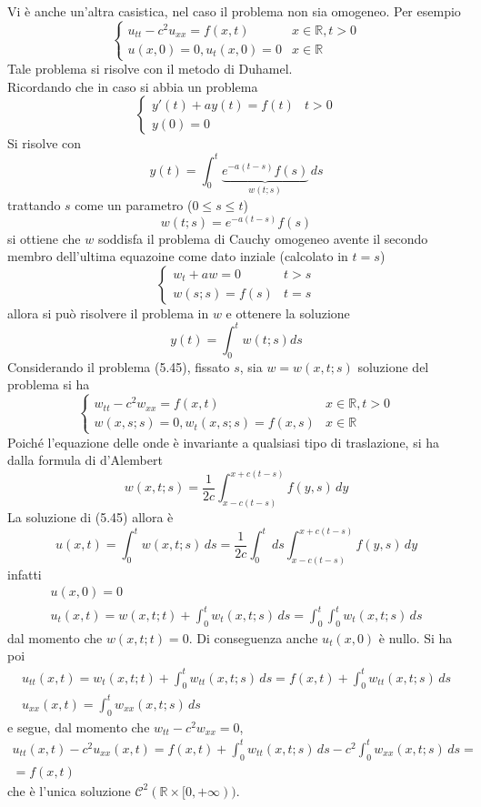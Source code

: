 \documentclass[a4paper,12pt, draft]{article}
\theoremstyle{break}
\numberwithin{equation}{section}
\begin{document}
Vi è anche un'altra casistica, nel caso il problema non sia omogeneo. Per esempio
\begin{equation}
  \begin{cases}
    u_{tt} - c^2 u_{xx} = f(x,t) & x \in \mathbb{R}, t > 0 \\
    u(x,0) = 0, u_t(x,0)= 0 & x \in \mathbb{R}
  \end{cases}
\end{equation}
Tale problema si risolve con il metodo di Duhamel. \\
Ricordando che in caso si abbia un problema 
\[
  \begin{cases} 
y'(t) + ay(t) = f(t) & t > 0 \\
y(0) = 0  
\end{cases}
\]
Si risolve con 
\[
  y(t) = \int_0^t \underbrace{e^{-a(t-s)}f(s)}_{w(t;s)} \, ds
\]
trattando \(s\) come un parametro (\(0 \leq s \leq t\))
\[
  w(t;s) = e^{-a(t-s)}f(s)
\]
si ottiene che \(w\) soddisfa il problema di Cauchy omogeneo avente il secondo membro dell'ultima equazoine come dato inziale (calcolato in \(t=s\))
\[
\begin{cases}
  w_t + aw = 0 & t > s \\
  w(s;s) = f(s) & t = s
\end{cases}  
\]
allora si può risolvere il problema in \(w\) e ottenere la soluzione 
\[
  y(t) = \int_0^t w(t;s)ds
\]
Considerando il problema (5.45), fissato \(s\), sia \(w = w(x, t; s)\) soluzione del problema si ha
\[
\begin{cases}
  w_{tt} - c^2w_{xx} = f(x,t) & x \in \mathbb{R}, t > 0 \\
  w(x, s; s) = 0, w_t(x, s; s) = f(x,s) & x \in \mathbb{R}
\end{cases}  
\]
Poiché l'equazione delle onde è invariante a qualsiasi tipo di traslazione, si ha dalla formula di d'Alembert
\[
w(x,t;s) = \frac{1}{2c} \int_{x-c(t-s)}^{x+c(t-s)} f(y,s) \, dy  
\]
La soluzione di (5.45) allora è
\[
  u(x,t) = \int_0^t w(x,t;s) \, ds = \frac{1}{2c} \int_0^t \, ds \int_{x-c(t-s)}^{x+c(t-s)} f(y,s) \, dy
\]
infatti 
\begin{eqnarray*}
  u(x,0) = 0 \\
  u_t(x,t) = w(x, t; t) + \int_0^t w_t(x, t; s) \, ds = \int_0^t \int_0^t w_t(x, t; s) \, ds
\end{eqnarray*}
dal momento che \(w(x,t;t) = 0\). Di conseguenza anche \(u_t(x,0)\) è nullo. Si ha poi 
\begin{eqnarray*}
  u_{tt}(x,t) = w_{t}(x,t;t) + \int_0^t w_{tt}(x,t;s) \, ds = f(x,t) + \int_0^t w_{tt} (x,t;s) \, ds \\
  u_{xx}(x,t) = \int_0^t w_{xx}(x,t;s) \, ds
\end{eqnarray*}
e segue, dal momento che \(w_{tt} - c^2w_{xx} = 0\), 
\[
\begin{array}{c}
  u_{tt} (x,t)-c^2u_{xx} (x,t) = f(x,t) + \int_0^tw_{tt}(x,t;s) \, ds - c^2 \int_0^t w_{xx}(x,t;s) \, ds = \\
  = f(x,t)
\end{array}  
\]
che è l'unica soluzione \(\mathcal{C}^2(\mathbb{R} \times [0, +\infty))\).
\end{document}
